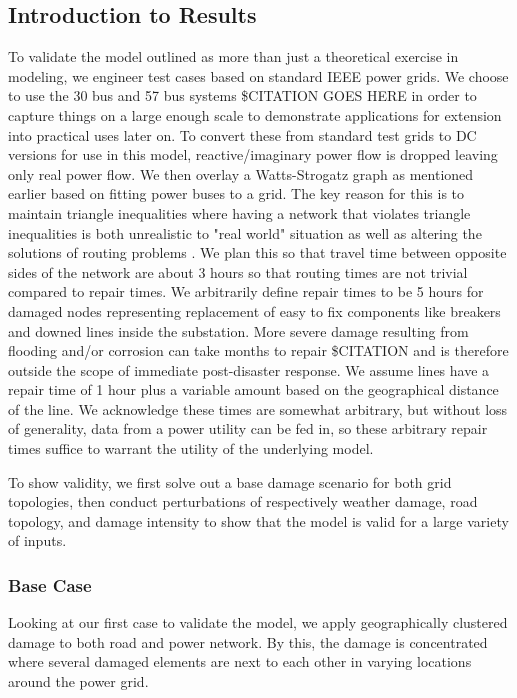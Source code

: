 \documentclass{article}
\begin{document}
	\subsection{Introduction to Results}
	To validate the model outlined as more than just a theoretical exercise in modeling, we engineer test cases based on standard IEEE power grids. We choose to use the 30 bus and 57 bus systems \$CITATION GOES HERE in order to capture things on a large enough scale to demonstrate applications for extension into practical uses later on. To convert these from standard test grids to DC versions for use in this model, reactive/imaginary power flow is dropped leaving only real power flow. We then overlay a Watts-Strogatz graph as mentioned earlier based on fitting power buses to a grid. The key reason for this is to maintain triangle inequalities where having a network that violates triangle inequalities is both unrealistic to "real world" situation as well as altering the solutions of routing problems \cite{FlemingEA2013}. We plan this so that travel time between opposite sides of the network are about 3 hours so that routing times are not trivial compared to repair times. We arbitrarily define repair times to be 5 hours for damaged nodes representing replacement of easy to fix components like breakers and downed lines inside the substation. More severe damage resulting from flooding and/or corrosion can take months to repair \$CITATION and is therefore outside the scope of immediate post-disaster response. We assume lines have a repair time of 1 hour plus a variable amount based on the geographical distance of the line. We acknowledge these times are somewhat arbitrary, but without loss of generality, data from a power utility can be fed in, so these arbitrary repair times suffice to warrant the utility of the underlying model.
	
	To show validity, we first solve out a base damage scenario for both grid topologies, then conduct perturbations of respectively weather damage, road topology, and damage intensity to show that the model is valid for a large variety of inputs. 
	
	\subsubsection{Base Case}
	Looking at our first case to validate the model, we apply geographically clustered damage to both road and power network. By this, the damage is concentrated where several damaged elements are next to each other in varying locations around the power grid. 
	
\end{document}
